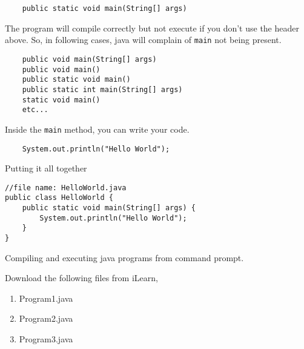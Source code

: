 \begin{questions}
\begin{verbatim}
	public static void main(String[] args)
\end{verbatim}

The program will compile correctly but not execute if you don't use the header above. So, in following cases, java will complain of \texttt{main} not being present.

\begin{verbatim}
	public void main(String[] args)
	public void main()
	public static void main()
	public static int main(String[] args)
	static void main()
	etc...
\end{verbatim}

Inside the \texttt{main} method, you can write your code.

\begin{lstlisting}
	System.out.println("Hello World");
\end{lstlisting}

Putting it all together

\begin{lstlisting}
//file name: HelloWorld.java
public class HelloWorld {
	public static void main(String[] args) {
		System.out.println("Hello World");
	}
}
\end{lstlisting}

\newpage

\begin{center}

\end{center}

\question Compiling and executing java programs from command prompt.

Download the following files from iLearn, 

\begin{enumerate}
\item Program1.java
\item Program2.java
\item Program3.java
\end{enumerate}


\end{questions}
